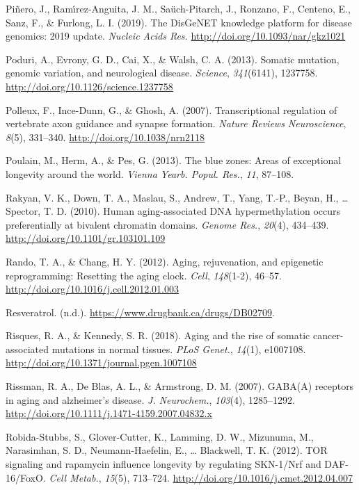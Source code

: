 \documentclass[12pt,twoside]{unicam}
\begin{document}
\begin{cslreferences}
\leavevmode\hypertarget{ref-Pinero2019}{}%
Piñero, J., Ramı́rez-Anguita, J. M., Saüch-Pitarch, J., Ronzano, F., Centeno, E., Sanz, F., \& Furlong, L. I. (2019). The DisGeNET knowledge platform for disease genomics: 2019 update. \emph{Nucleic Acids Res.} \url{http://doi.org/10.1093/nar/gkz1021}

\leavevmode\hypertarget{ref-Poduri2013}{}%
Poduri, A., Evrony, G. D., Cai, X., \& Walsh, C. A. (2013). Somatic mutation, genomic variation, and neurological disease. \emph{Science}, \emph{341}(6141), 1237758. \url{http://doi.org/10.1126/science.1237758}

\leavevmode\hypertarget{ref-Polleux2007}{}%
Polleux, F., Ince-Dunn, G., \& Ghosh, A. (2007). Transcriptional regulation of vertebrate axon guidance and synapse formation. \emph{Nature Reviews Neuroscience}, \emph{8}(5), 331--340. \url{http://doi.org/10.1038/nrn2118}

\leavevmode\hypertarget{ref-Poulain2013}{}%
Poulain, M., Herm, A., \& Pes, G. (2013). The blue zones: Areas of exceptional longevity around the world. \emph{Vienna Yearb. Popul. Res.}, \emph{11}, 87--108.

\leavevmode\hypertarget{ref-Rakyan2010}{}%
Rakyan, V. K., Down, T. A., Maslau, S., Andrew, T., Yang, T.-P., Beyan, H., \ldots{} Spector, T. D. (2010). Human aging-associated DNA hypermethylation occurs preferentially at bivalent chromatin domains. \emph{Genome Res.}, \emph{20}(4), 434--439. \url{http://doi.org/10.1101/gr.103101.109}

\leavevmode\hypertarget{ref-Rando2012}{}%
Rando, T. A., \& Chang, H. Y. (2012). Aging, rejuvenation, and epigenetic reprogramming: Resetting the aging clock. \emph{Cell}, \emph{148}(1-2), 46--57. \url{http://doi.org/10.1016/j.cell.2012.01.003}

\leavevmode\hypertarget{ref-Resveratrol}{}%
Resveratrol. (n.d.). \url{https://www.drugbank.ca/drugs/DB02709}.

\leavevmode\hypertarget{ref-Risques2018}{}%
Risques, R. A., \& Kennedy, S. R. (2018). Aging and the rise of somatic cancer-associated mutations in normal tissues. \emph{PLoS Genet.}, \emph{14}(1), e1007108. \url{http://doi.org/10.1371/journal.pgen.1007108}

\leavevmode\hypertarget{ref-Rissman2007}{}%
Rissman, R. A., De Blas, A. L., \& Armstrong, D. M. (2007). GABA(A) receptors in aging and alzheimer's disease. \emph{J. Neurochem.}, \emph{103}(4), 1285--1292. \url{http://doi.org/10.1111/j.1471-4159.2007.04832.x}

\leavevmode\hypertarget{ref-Robida-Stubbs2012}{}%
Robida-Stubbs, S., Glover-Cutter, K., Lamming, D. W., Mizunuma, M., Narasimhan, S. D., Neumann-Haefelin, E., \ldots{} Blackwell, T. K. (2012). TOR signaling and rapamycin influence longevity by regulating SKN-1/Nrf and DAF-16/FoxO. \emph{Cell Metab.}, \emph{15}(5), 713--724. \url{http://doi.org/10.1016/j.cmet.2012.04.007}


\end{cslreferences}
\end{document}
